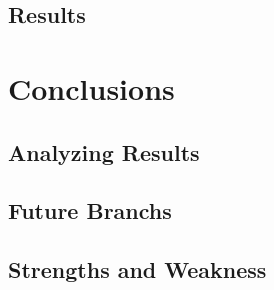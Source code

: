 \documentclass{book} %
\begin{document}
\section{Results}



\chapter{Conclusions} \label{chap:c6_conclusions}
\section{Analyzing Results}
\section{Future Branchs}
\section{Strengths and Weakness}

\listoffigures{}
\end{document}
